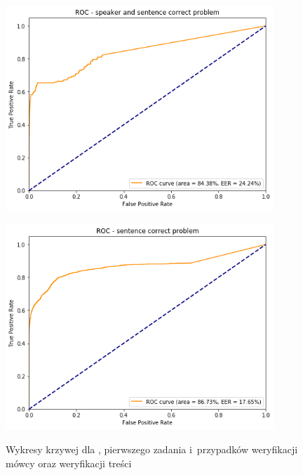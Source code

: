 \begin{figure}[H]
    \centering
    \begin{minipage}{.5\textwidth}
        \centering
        \includegraphics[width=0.9\textwidth]{images/4_3_dnn_roc_speaker}
        \label{fig:4_3_dnn_roc_speaker}
    \end{minipage}%
    \begin{minipage}{.5\textwidth}
        \centering
        \includegraphics[width=0.9\textwidth]{images/4_3_dnn_roc_sentence}
        \label{fig:4_3_dnn_roc_sentence}
    \end{minipage}%
    \caption{Wykresy krzywej  dla , pierwszego zadania  i~przypadków weryfikacji mówcy oraz weryfikacji treści}
\end{figure}

